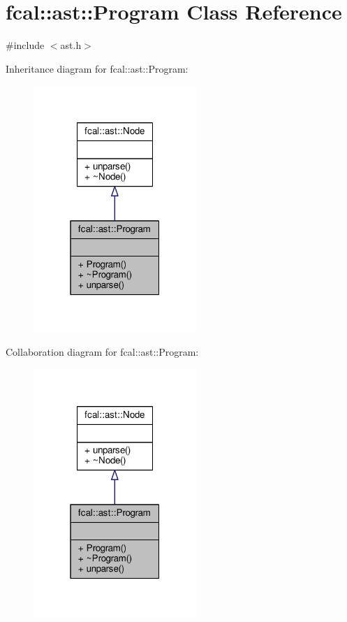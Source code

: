 \hypertarget{classfcal_1_1ast_1_1Program}{}\section{fcal\+:\+:ast\+:\+:Program Class Reference}
\label{classfcal_1_1ast_1_1Program}


{\ttfamily \#include $<$ast.\+h$>$}



Inheritance diagram for fcal\+:\+:ast\+:\+:Program\+:
\nopagebreak
\begin{figure}[H]
\begin{center}
\leavevmode
\includegraphics[width=175pt]{classfcal_1_1ast_1_1Program__inherit__graph}
\end{center}
\end{figure}


Collaboration diagram for fcal\+:\+:ast\+:\+:Program\+:
\nopagebreak
\begin{figure}[H]
\begin{center}
\leavevmode
\includegraphics[width=175pt]{classfcal_1_1ast_1_1Program__coll__graph}
\end{center}
\end{figure}

